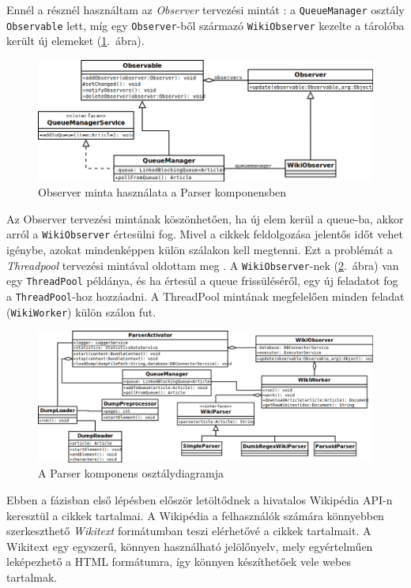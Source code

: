 Ennél a résznél használtam az \textit{Observer} tervezési mintát \cite{designpatterns}: a \texttt{QueueManager} osztály \texttt{Observable} lett, míg egy \texttt{Observer}-ből származó \texttt{WikiObserver} kezelte a tárolóba került új elemeket (\ref{fig:class_parser}.~ábra).

\begin{figure}[htp]
\centering
\includegraphics[scale=0.5]{img/class_parser}
\caption{Observer minta használata a Parser komponensben}
\label{fig:class_parser}
\end{figure}

Az Observer tervezési mintának köszönhetően, ha új elem kerül a queue-ba, akkor arról a \texttt{WikiObserver} értesülni fog. Mivel a cikkek feldolgozása jelentős időt vehet igénybe, azokat mindenképpen külön szálakon kell megtenni. Ezt a problémát a \textit{Threadpool} tervezési mintával oldottam meg \cite{javaconcurrencyinpractice}. A \texttt{WikiObserver}-nek (\ref{fig:class_parser2}.~ábra) van egy \texttt{ThreadPool} példánya, és ha értesül a queue frissüléséről, egy új feladatot fog a \texttt{ThreadPool}-hoz hozzáadni. A ThreadPool mintának megfelelően minden feladat (\texttt{WikiWorker}) külön szálon fut. 

\begin{figure}[htp]
\centering
\includegraphics[scale=0.4]{img/class_parser2}
\caption{A Parser komponens osztálydiagramja}
\label{fig:class_parser2}
\end{figure}

Ebben a fázisban első lépésben először letöltődnek a hivatalos Wikipédia API-n keresztül a cikkek tartalmai. A Wikipédia a felhasználók számára könnyebben szerkeszthető \textit{Wikitext} formátumban teszi elérhetővé a cikkek tartalmait. A Wikitext egy egyszerű, könnyen használható jelölőnyelv, mely egyértelműen leképezhető a HTML formátumra, így könnyen készíthetőek vele webes tartalmak.

